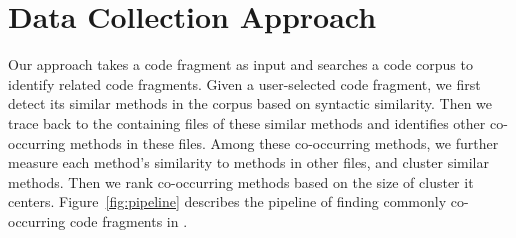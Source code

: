 \section{Data Collection Approach}
\label{sec:approach}
Our approach takes a code fragment as input and searches a code corpus to identify related code fragments. Given a user-selected code fragment, we first detect its similar methods in the corpus based on syntactic similarity. Then we trace back to the containing files of these similar methods and identifies other co-occurring methods in these files. Among these co-occurring methods, we further measure each method's similarity to methods in other files, and cluster similar methods. Then we rank co-occurring methods based on the size of cluster it centers. Figure~\ref{fig:pipeline} describes the pipeline of finding commonly co-occurring code fragments in {\tool}. 


